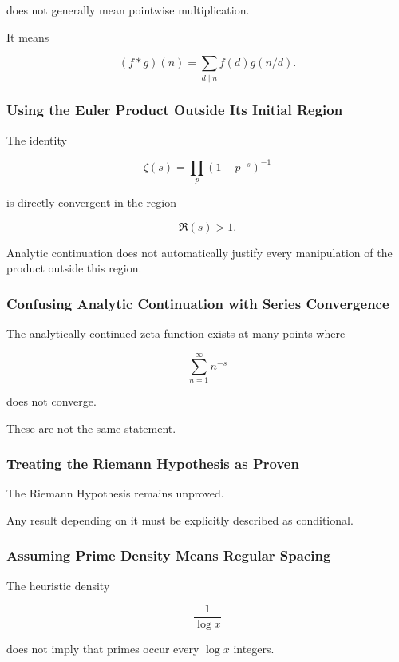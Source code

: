 does not generally mean pointwise multiplication.

It means

\[ (f*g)(n)=\sum_{d\mid n}f(d)g(n/d). \]

\subsubsection{Using the Euler Product Outside Its Initial Region}

The identity

\[ \zeta(s)=\prod_p(1-p^{-s})^{-1} \]

is directly convergent in the region

\[ \Re(s)>1. \]

Analytic continuation does not automatically justify every manipulation of
the product outside this region.

\subsubsection{Confusing Analytic Continuation with Series Convergence}

The analytically continued zeta function exists at many points where

\[ \sum_{n=1}^{\infty}n^{-s} \]

does not converge.

These are not the same statement.

\subsubsection{Treating the Riemann Hypothesis as Proven}

The Riemann Hypothesis remains unproved.

Any result depending on it must be explicitly described as conditional.

\subsubsection{Assuming Prime Density Means Regular Spacing}

The heuristic density

\[ \frac1{\log x} \]

does not imply that primes occur every \(\log x\) integers.

